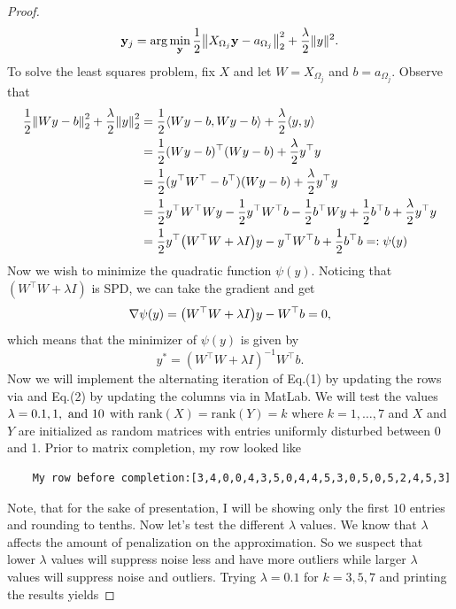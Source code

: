 \documentclass[12pt]{report}
\begin{document}
\begin{problem}
\begin{proof}
\[
    \mathbf{y}_j = \arg \min_\mathbf{y}\frac{1}{2}{\left\|X_{\Omega_j}\mathbf{y}  - a_{\Omega_j}\right\|}_2^2 + \frac{\lambda}{2}\|y\|^2.
\]
To solve the least squares problem, fix $X$ and let $W = X_{\Omega_j}$ and $b = a_{\Omega_j}$. Observe that
\begin{align*}
    \frac{1}{2}{\left\|Wy - b\right\|}_2^2 + \frac{\lambda}{2}{\left\|y\right\|}_2^2 &= \frac{1}{2}{\left\langle Wy - b,Wy - b\right\rangle} + \frac{\lambda}{2}{\left\langle y,y\right\rangle}\\
    &= \frac{1}{2}(Wy - b)^\top(Wy - b) + \frac{\lambda}{2}y^\top y\\
    &= \frac{1}{2}(y^\top W^\top - b^\top)(Wy - b) + \frac{\lambda}{2}y^\top y\\
    &= \frac{1}{2}y^\top W^\top Wy - \frac{1}{2}y^\top W^\top b - \frac{1}{2}b^\top Wy + \frac{1}{2}b^\top b + \frac{\lambda}{2}y^\top y\\
    &= \frac{1}{2}y^\top {\left(W^\top W + \lambda I\right)}y - y^\top W^\top b + \frac{1}{2}b^\top b =: \psi(y)\\
\end{align*} 
Now we wish to minimize the quadratic function $\psi(y)$. Noticing that $(W^\top W + \lambda I)$ is SPD, we can take the gradient and get
\[
    \nabla \psi(y) = {\left(W^\top W + \lambda I\right)}y - W^\top b = 0,
\]
which means that the minimizer of $\psi(y)$ is given by
\begin{equation} \label{yupdate}
    y^* = (W^\top W + \lambda I)^{-1} W^\top b.
\end{equation}
Now we will implement the alternating iteration of Eq.(1) by updating the rows via  and Eq.(2) by updating the columns via  in MatLab. We will test the values $\lambda = 0.1, 1, {~\text{and}~} 10$ with $\text{rank}(X) = \text{rank}(Y) = k$ where $k=1,\dots,7$ and $X$ and $Y$ are initialized as random matrices with entries uniformly disturbed between 0 and 1. Prior to matrix completion, my row looked like
\begin{verbatim}
    My row before completion:[3,4,0,0,4,3,5,0,4,4,5,3,0,5,0,5,2,4,5,3]
\end{verbatim}
Note, that for the sake of presentation, I will be showing only the first $10$ entries and rounding to tenths. Now let's test the different $\lambda$ values. We know that $\lambda$ affects the amount of penalization on the approximation. So we suspect that lower $\lambda$ values will suppress noise less and have more outliers while larger $\lambda$ values will suppress noise and outliers. Trying $\lambda = 0.1$ for $k=3,5,7$ and printing the results yields

\end{proof}
\end{problem}
\end{document}
